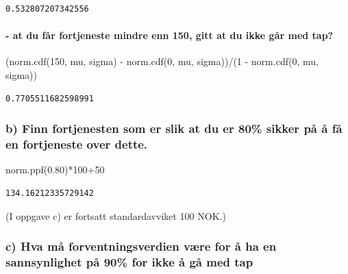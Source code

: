 \documentclass[
  12pt,
  a4paper,
  DIV=11,
  numbers=noendperiod]{scrartcl}
\let\oldparagraph\paragraph
\renewcommand{\paragraph}[1]{\oldparagraph{#1}\mbox{}}
\newenvironment{Shaded}{\begin{snugshade}}{\end{snugshade}}
\newcommand{\DecValTok}[1]{\textcolor[rgb]{0.68,0.00,0.00}{#1}}
\newcommand{\FloatTok}[1]{\textcolor[rgb]{0.68,0.00,0.00}{#1}}
\newcommand{\NormalTok}[1]{\textcolor[rgb]{0.00,0.23,0.31}{#1}}
\newcommand{\OperatorTok}[1]{\textcolor[rgb]{0.37,0.37,0.37}{#1}}
\begin{document}
\begin{verbatim}
0.532807207342556
\end{verbatim}

\paragraph{- at du får fortjeneste mindre enn 150, gitt at du ikke går
med
tap?}\label{at-du-fuxe5r-fortjeneste-mindre-enn-150-gitt-at-du-ikke-guxe5r-med-tap}

\begin{Shaded}
\begin{Highlighting}[]
\NormalTok{(norm.cdf(}\DecValTok{150}\NormalTok{, mu, sigma) }\OperatorTok{{-}}\NormalTok{ norm.cdf(}\DecValTok{0}\NormalTok{, mu, sigma))}\OperatorTok{/}\NormalTok{(}\DecValTok{1} \OperatorTok{{-}}\NormalTok{ norm.cdf(}\DecValTok{0}\NormalTok{, mu, sigma))}
\end{Highlighting}
\end{Shaded}

\begin{verbatim}
0.7705511682598991
\end{verbatim}

\subsubsection{b) Finn fortjenesten som er slik at du er 80\% sikker på
å få en fortjeneste over
dette.}\label{b-finn-fortjenesten-som-er-slik-at-du-er-80-sikker-puxe5-uxe5-fuxe5-en-fortjeneste-over-dette.}

\begin{Shaded}
\begin{Highlighting}[]
\NormalTok{norm.ppf(}\FloatTok{0.80}\NormalTok{)}\OperatorTok{*}\DecValTok{100}\OperatorTok{+}\DecValTok{50}
\end{Highlighting}
\end{Shaded}

\begin{verbatim}
134.16212335729142
\end{verbatim}

(I oppgave c) er fortsatt standardavviket 100 NOK.)

\subsubsection{c) Hva må forventningsverdien være for å ha en
sannsynlighet på 90\% for ikke å gå med
tap}\label{c-hva-muxe5-forventningsverdien-vuxe6re-for-uxe5-ha-en-sannsynlighet-puxe5-90-for-ikke-uxe5-guxe5-med-tap}
\end{document}
